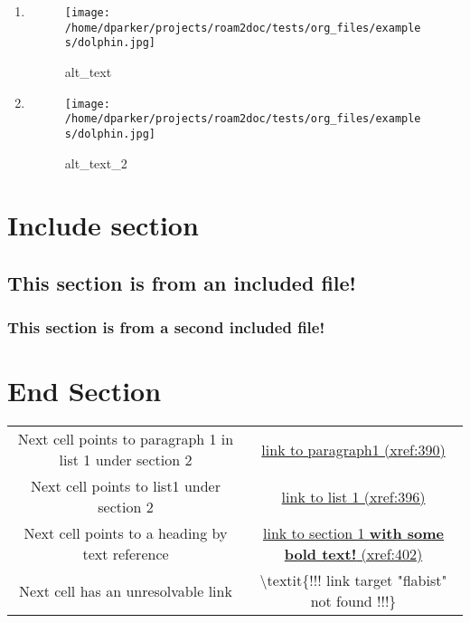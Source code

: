 \documentclass[11pt]{article}
\begin{document}
\begin{enumerate}
\item
\begin{figure} [ht]
\centering
\texttt{[image: /home/dparker/projects/roam2doc/tests/org\_files/examples/dolphin.jpg]}
\caption{alt\_text}
\end{figure}
\item
\begin{figure} [ht]
\centering
\texttt{[image: /home/dparker/projects/roam2doc/tests/org\_files/examples/dolphin.jpg]}
\caption{alt\_text\_2}
\end{figure}
\vspace{\baselineskip}
\end{enumerate}
\section{Include section  }
 \label{obj-370}
 \label{obj-369}
\subsection{This section is from an included file!  }
 \label{obj-373}
 \label{obj-372}
\vspace{\baselineskip}
\subsubsection{This section is from a second included file!  }
 \label{obj-377}
 \label{obj-376}
\vspace{\baselineskip}
\section{End Section  }
 \label{obj-381}
 \label{obj-380}
\label{obj-384} 

\begin{tabular}{|c|c|}
\hline
 Next cell points to paragraph 1 in list 1 under section 2  & \hyperref[obj-50]{link to paragraph1 (xref:390)} \\
 Next cell points to list1 under section 2                  & \hyperref[obj-75]{link to list 1 (xref:396)} \\
 Next cell points to a heading by text reference            & \hyperref[obj-15]{link to section 1 \textbf{with some bold text!} (xref:402)} \\
 Next cell has an unresolvable link                         & \textbackslash{}textit\{!!! link target "flabist" not found !!!\} \\
\hline
\end{tabular}
\vspace{\baselineskip}
\vspace{\baselineskip}
\printindex
\end{document}

